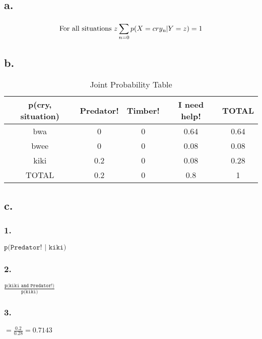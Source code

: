 \documentclass[a4paper,12pt]{article}
\begin{document}
\subsection*{a. }
\begin{equation}
\textrm{For all situations }z
 \sum^{}_{n=0} p (X = cry\textsubscript{n} | Y =z) = 1 
\end{equation}
\subsection*{b. }
    \begin{table}[h!]
    \begin{center}
    \caption{Joint Probability Table}
    \label{Table 3}
    \begin{tabular}{|c|c|c|c|c|}
    \hline
    p(cry, situation) & Predator! & Timber! & I need help! & TOTAL\\
    \hline
    bwa & 0 & 0& 0.64 & 0.64\\
    \hline
    bwee & 0 & 0& 0.08 & 0.08\\
    \hline
    kiki & 0.2 & 0& 0.08 & 0.28\\
    \hline
    TOTAL & 0.2 & 0& 0.8 & 1\\
    \hline
    \end{tabular}
    \end{center}
    \end{table}
 \subsection*{c. }
 \subsubsection*{1.}
 \begin{center}
  $\texttt{p(Predator! | kiki)} $
 \end{center}
 \subsubsection*{2.}
 \begin{center}
  $\frac{\texttt{p(kiki and Predator!)}}{\texttt{p(kiki)}}$
 \end{center}
 \subsubsection*{3.}
 \begin{center}
 $= \frac{0.2}{0.28} = 0.7143$
 \end{center}
\end{document}
